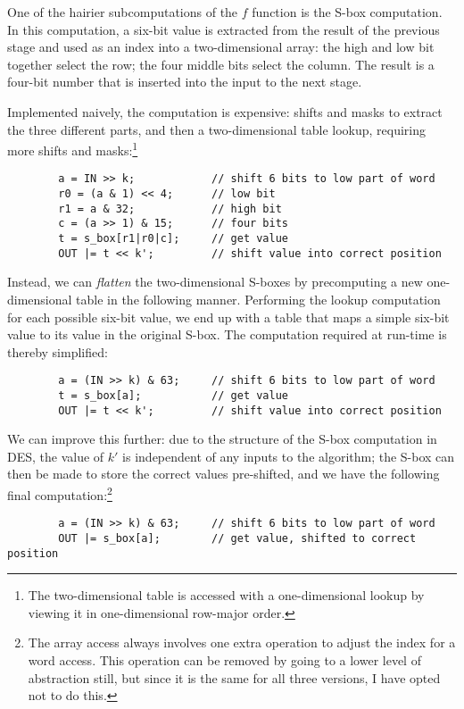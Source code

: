 One of the hairier subcomputations of the $f$ function is the S-box
computation.  In this computation, a six-bit value is extracted from the
result of the previous stage and used as an index into a two-dimensional
array: the high and low bit together select the row; the four middle
bits select the column.  The result is a four-bit number that is
inserted into the input to the next stage.

Implemented naively, the computation is expensive: shifts and masks to
extract the three different parts, and then a two-dimensional table
lookup, requiring more shifts and masks:\footnote{The two-dimensional
table is accessed with a one-dimensional lookup by viewing it in
one-dimensional row-major order.}

\begin{verbatim}
        a = IN >> k;            // shift 6 bits to low part of word
        r0 = (a & 1) << 4;      // low bit
        r1 = a & 32;            // high bit
        c = (a >> 1) & 15;      // four bits
        t = s_box[r1|r0|c];     // get value
        OUT |= t << k';         // shift value into correct position
\end{verbatim}

Instead, we can {\em flatten} the two-dimensional S-boxes by
precomputing a new one-dimensional table in the following manner.
Performing the lookup computation for each possible six-bit value, we
end up with a table that maps a simple six-bit value to its value in the
original S-box.  The computation required at run-time is thereby
simplified:

\begin{verbatim}
        a = (IN >> k) & 63;     // shift 6 bits to low part of word
        t = s_box[a];           // get value
        OUT |= t << k';         // shift value into correct position
\end{verbatim}

We can improve this further: due to the structure of the S-box
computation in DES, the value of $k'$ is independent of any inputs to
the algorithm; the S-box can then be made to store the correct values
pre-shifted, and we have the following final computation:\footnote{The array
access always involves one extra operation to adjust the index for a
word access.  This operation can be removed by going to a lower level of
abstraction still, but since it is the same for all three versions, I
have opted not to do this.}

\begin{verbatim}
        a = (IN >> k) & 63;     // shift 6 bits to low part of word
        OUT |= s_box[a];        // get value, shifted to correct position
\end{verbatim}


